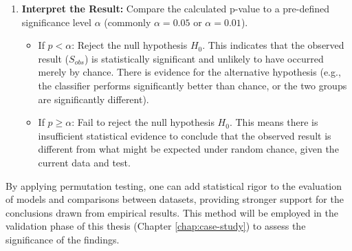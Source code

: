 \begin{enumerate}
  \item \textbf{Interpret the Result:} Compare the calculated p-value to a pre-defined significance level $\alpha$ (commonly $\alpha = 0.05$ or $\alpha = 0.01$).
        \begin{itemize}
          \item If $p < \alpha$: Reject the null hypothesis $H_0$. This indicates that the observed result ($S_{obs}$) is statistically significant and unlikely to have occurred merely by chance. There is evidence for the alternative hypothesis (e.g., the classifier performs significantly better than chance, or the two groups are significantly different).
          \item If $p \ge \alpha$: Fail to reject the null hypothesis $H_0$. This means there is insufficient statistical evidence to conclude that the observed result is different from what might be expected under random chance, given the current data and test.
        \end{itemize}
\end{enumerate}

By applying permutation testing, one can add statistical rigor to the evaluation of models and comparisons between datasets, providing stronger support for the conclusions drawn from empirical results. This method will be employed in the validation phase of this thesis (Chapter \autoref{chap:case-study}) to assess the significance of the findings.